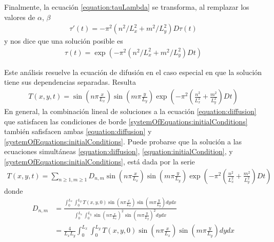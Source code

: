 \documentclass{article}
\begin{document}
    Finalmente, la ecuación \eqref{equation:tauLambda} se transforma, al remplazar los valores de \(\alpha\), \(\beta\)
    \begin{align}
      \tau'(t) = - \pi^2 (n^2 / L_x^2 + m^2 / L_y^2) D \tau(t)
    \end{align}
    y nos dice que una solución posible es
    \begin{align}
      \tau(t) = \exp\left( - \pi^2 (n^2 / L_x^2 + m^2 / L_y^2) D t \right)
    \end{align}

    Este análisis resuelve la ecuación de difusión en el caso especial en que la solución tiene sus dependencias separadas.
    Resulta
    \begin{align}
      T(x, y, t)
      =
      \sin\left(n \pi \frac{x}{L_x} \right)
      \sin\left(m \pi \frac{y}{L_y}\right)
      \exp\left(
        - \pi^2 \left(
          \frac{n^2}{L_x^2} + \frac{m^2}{L_y^2}
        \right)
        D t
      \right)
    \end{align}
    En general, la combinación lineal de soluciones a la ecuación \eqref{equation:diffusion} que satisfacen las condiciones de borde \eqref{systemOfEquations:initialConditions}
    también safisfacen ambas \eqref{equation:diffusion} y \eqref{systemOfEquations:initialConditions}.
    Puede probarse que la solución a las ecuaciones simultáneas
    \eqref{equation:diffusion},
    \eqref{equation:initialCondition},
    y \eqref{systemOfEquations:initialConditions},
    está dada por la serie
    \begin{align}
      T(x, y, t)
      =
      \sum_{n \geq 1, m \geq 1}
        D_{n, m}
        \sin\left( n \pi \frac{x}{L_x} \right)
        \sin\left( m \pi \frac{y}{L_y} \right)
        \exp\left(
          - \pi^2 \left(
            \frac{n^2}{L_x^2} + \frac{m^2}{L_y^2}
          \right)
          D t
        \right)
    \end{align}
    donde
    \begin{align}
      D_{n, m}
      &=
      \frac{
        \int_0^{L_x}
          \int_0^{L_y}
            T(x, y, 0)
            \sin\left( n \pi \frac{x}{L_x} \right)
            \sin\left( m \pi \frac{y}{L_y} \right)
          d y
        d x
      }{
        \int_0^{L_x}
          \int_0^{L_y}
          \sin\left( n \pi \frac{x}{L_x} \right)^2
            \sin\left( m \pi \frac{y}{L_y} \right)^2
          d y
        d x
      }
      \\
      &=
      \frac{4}{L_x L_y} 
      \int_0^{L_x}
        \int_0^{L_y}
          T(x, y, 0)
          \sin\left( n \pi \frac{x}{L_x} \right)
          \sin\left( m \pi \frac{y}{L_y} \right)
        d y
      d x
    \end{align}
\end{document}
